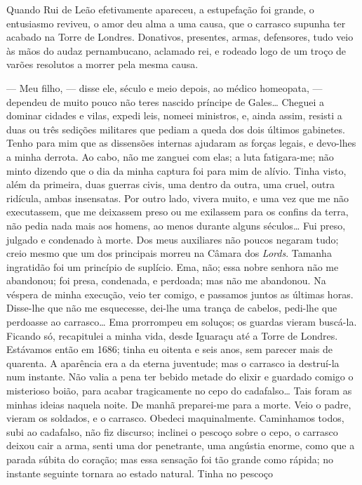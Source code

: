 Quando Rui de Leão efetivamente apareceu, a estupefação foi grande, o
entusiasmo reviveu, o amor deu alma a uma causa, que o carrasco supunha
ter acabado na Torre de Londres. Donativos, presentes, armas,
defensores, tudo veio às mãos do audaz pernambucano, aclamado rei, e
rodeado logo de um troço de varões resolutos a morrer pela mesma causa.

--- Meu filho, --- disse ele, século e meio depois, ao médico
homeopata, --- dependeu de muito pouco não teres nascido príncipe de
Gales\ldots{} Cheguei a dominar cidades e vilas, expedi leis, nomeei
ministros, e, ainda assim, resisti a duas ou três sedições militares que
pediam a queda dos dois últimos gabinetes. Tenho para mim que as
dissensões internas ajudaram as forças legais, e devo-lhes a minha
derrota. Ao cabo, não me zanguei com elas; a luta fatigara-me; não minto
dizendo que o dia da minha captura foi para mim de alívio. Tinha visto,
além da primeira, duas guerras civis, uma dentro da outra, uma cruel,
outra ridícula, ambas insensatas. Por outro lado, vivera muito, e uma
vez que me não executassem, que me deixassem preso ou me exilassem para
os confins da terra, não pedia nada mais aos homens, ao menos durante
alguns séculos\ldots{} Fui preso, julgado e condenado à morte. Dos meus
auxiliares não poucos negaram tudo; creio mesmo que um dos principais
morreu na Câmara dos \emph{Lords}. Tamanha ingratidão foi um princípio
de suplício. Ema, não; essa nobre senhora não me abandonou; foi presa,
condenada, e perdoada; mas não me abandonou. Na véspera de minha
execução, veio ter comigo, e passamos juntos as últimas horas. Disse-lhe
que não me esquecesse, dei-lhe uma trança de cabelos, pedi-lhe que
perdoasse ao carrasco\ldots{} Ema prorrompeu em soluços; os guardas vieram
buscá-la. Ficando só, recapitulei a minha vida, desde Iguaraçu até a
Torre de Londres. Estávamos então em 1686; tinha eu oitenta e seis anos,
sem parecer mais de quarenta. A aparência era a da eterna juventude; mas
o carrasco ia destruí-la num instante. Não valia a pena ter bebido
metade do elixir e guardado comigo o misterioso boião, para acabar
tragicamente no cepo do cadafalso\ldots{} Tais foram as minhas ideias naquela
noite. De manhã preparei-me para a morte. Veio o padre, vieram os
soldados, e o carrasco. Obedeci maquinalmente. Caminhamos todos, subi ao
cadafalso, não fiz discurso; inclinei o pescoço sobre o cepo, o carrasco
deixou cair a arma, senti uma dor penetrante, uma angústia enorme, como
que a parada súbita do coração; mas essa sensação foi tão grande como
rápida; no instante seguinte tornara ao estado natural. Tinha no pescoço
